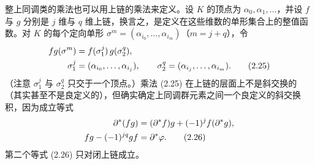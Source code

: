 整上同调类的乘法也可以用上链的乘法来定义。设 $K$ 的顶点为 $\alpha_0,\alpha_1,\dots$，并设 $f$ 与 $g$ 分别是 $j$ 维与 $q$ 维上链，换言之，是定义在这些维数的单形集合上的整值函数。对 $K$ 的每个定向单形 $\sigma^m=(\alpha_{i_0},\dots,\alpha_{i_m})$（$m=j+q$），令
\begin{align}
  fg(\sigma^m) &= f(\sigma_1^j)\,g(\sigma_2^q),\notag\\
  \sigma_1^j &= (\alpha_{i_0},\dots,\alpha_{i_j}),\qquad
  \sigma_2^q=(\alpha_{i_j},\dots,\alpha_{i_m}). \tag{2.25}
\end{align}
（注意 $\sigma_1^j$ 与 $\sigma_2^q$ 只交于一个顶点。）乘法 (2.25) 在上链的层面上不是斜交换的（其实甚至不是良定义的），但确实确定上同调群元素之间一个良定义的斜交换积，因为成立等式
\begin{align}
  \partial^*(fg) &= (\partial^*f)g+(-1)^j f(\partial^*g),\notag\\
  fg-(-1)^{jq}gf &= \partial^*\varphi. \tag{2.26}
\end{align}
第二个等式 (2.26) 只对闭上链成立。

